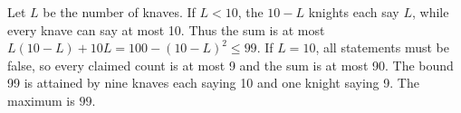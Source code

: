 Let $L$ be the number of knaves. If $L<10$, the $10-L$ knights each say $L$, while every knave can say at most 10. Thus the sum is at most $L(10-L)+10L=100-(10-L)^2\le99$. If $L=10$, all statements must be false, so every claimed count is at most 9 and the sum is at most 90. The bound 99 is attained by nine knaves each saying 10 and one knight saying 9. The maximum is $\boxed{99}$.
